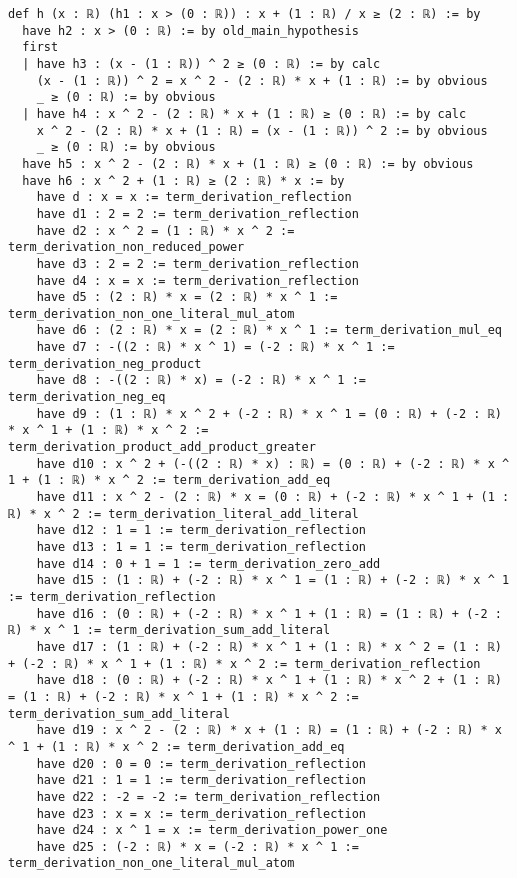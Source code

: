 \documentclass{article}
\begin{document}
\begin{tcolorbox}[colback=white!10, width=\linewidth]
\begin{lstlisting}[language=Lean4]
def h (x : ℝ) (h1 : x > (0 : ℝ)) : x + (1 : ℝ) / x ≥ (2 : ℝ) := by
  have h2 : x > (0 : ℝ) := by old_main_hypothesis
  first
  | have h3 : (x - (1 : ℝ)) ^ 2 ≥ (0 : ℝ) := by calc
    (x - (1 : ℝ)) ^ 2 = x ^ 2 - (2 : ℝ) * x + (1 : ℝ) := by obvious
    _ ≥ (0 : ℝ) := by obvious
  | have h4 : x ^ 2 - (2 : ℝ) * x + (1 : ℝ) ≥ (0 : ℝ) := by calc
    x ^ 2 - (2 : ℝ) * x + (1 : ℝ) = (x - (1 : ℝ)) ^ 2 := by obvious
    _ ≥ (0 : ℝ) := by obvious
  have h5 : x ^ 2 - (2 : ℝ) * x + (1 : ℝ) ≥ (0 : ℝ) := by obvious
  have h6 : x ^ 2 + (1 : ℝ) ≥ (2 : ℝ) * x := by
    have d : x = x := term_derivation_reflection
    have d1 : 2 = 2 := term_derivation_reflection
    have d2 : x ^ 2 = (1 : ℝ) * x ^ 2 := term_derivation_non_reduced_power
    have d3 : 2 = 2 := term_derivation_reflection
    have d4 : x = x := term_derivation_reflection
    have d5 : (2 : ℝ) * x = (2 : ℝ) * x ^ 1 := term_derivation_non_one_literal_mul_atom
    have d6 : (2 : ℝ) * x = (2 : ℝ) * x ^ 1 := term_derivation_mul_eq
    have d7 : -((2 : ℝ) * x ^ 1) = (-2 : ℝ) * x ^ 1 := term_derivation_neg_product
    have d8 : -((2 : ℝ) * x) = (-2 : ℝ) * x ^ 1 := term_derivation_neg_eq
    have d9 : (1 : ℝ) * x ^ 2 + (-2 : ℝ) * x ^ 1 = (0 : ℝ) + (-2 : ℝ) * x ^ 1 + (1 : ℝ) * x ^ 2 := term_derivation_product_add_product_greater
    have d10 : x ^ 2 + (-((2 : ℝ) * x) : ℝ) = (0 : ℝ) + (-2 : ℝ) * x ^ 1 + (1 : ℝ) * x ^ 2 := term_derivation_add_eq
    have d11 : x ^ 2 - (2 : ℝ) * x = (0 : ℝ) + (-2 : ℝ) * x ^ 1 + (1 : ℝ) * x ^ 2 := term_derivation_literal_add_literal
    have d12 : 1 = 1 := term_derivation_reflection
    have d13 : 1 = 1 := term_derivation_reflection
    have d14 : 0 + 1 = 1 := term_derivation_zero_add
    have d15 : (1 : ℝ) + (-2 : ℝ) * x ^ 1 = (1 : ℝ) + (-2 : ℝ) * x ^ 1 := term_derivation_reflection
    have d16 : (0 : ℝ) + (-2 : ℝ) * x ^ 1 + (1 : ℝ) = (1 : ℝ) + (-2 : ℝ) * x ^ 1 := term_derivation_sum_add_literal
    have d17 : (1 : ℝ) + (-2 : ℝ) * x ^ 1 + (1 : ℝ) * x ^ 2 = (1 : ℝ) + (-2 : ℝ) * x ^ 1 + (1 : ℝ) * x ^ 2 := term_derivation_reflection
    have d18 : (0 : ℝ) + (-2 : ℝ) * x ^ 1 + (1 : ℝ) * x ^ 2 + (1 : ℝ) = (1 : ℝ) + (-2 : ℝ) * x ^ 1 + (1 : ℝ) * x ^ 2 := term_derivation_sum_add_literal
    have d19 : x ^ 2 - (2 : ℝ) * x + (1 : ℝ) = (1 : ℝ) + (-2 : ℝ) * x ^ 1 + (1 : ℝ) * x ^ 2 := term_derivation_add_eq
    have d20 : 0 = 0 := term_derivation_reflection
    have d21 : 1 = 1 := term_derivation_reflection
    have d22 : -2 = -2 := term_derivation_reflection
    have d23 : x = x := term_derivation_reflection
    have d24 : x ^ 1 = x := term_derivation_power_one
    have d25 : (-2 : ℝ) * x = (-2 : ℝ) * x ^ 1 := term_derivation_non_one_literal_mul_atom

\end{lstlisting}
\end{tcolorbox}
\end{document}

